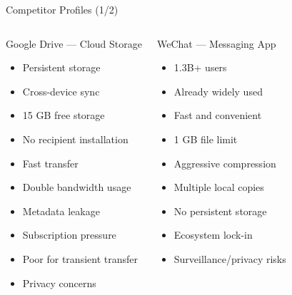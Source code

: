\documentclass[xcolor=table,dvipsnames,svgnames,aspectratio=169]{beamer}
\begin{document}
\begin{frame}{Competitor Profiles (1/2)}

\vspace{-1.2em}

\footnotesize
\setlength{\itemsep}{0em}
\linespread{0.9}\selectfont

\begin{columns}[t]


\begin{block}{Google Drive --- Cloud Storage}
\begin{itemize}
  \item[\faPlus] Persistent storage
  \item[\faPlus] Cross-device sync
  \item[\faPlus] 15 GB free storage
  \item[\faPlus] No recipient installation
  \item[\faPlus] Fast transfer
  \item[\faMinus] Double bandwidth usage
  \item[\faMinus] Metadata leakage
  \item[\faMinus] Subscription pressure
  \item[\faMinus] Poor for transient transfer
  \item[\faMinus] Privacy concerns
\end{itemize}
\end{block}


\begin{block}{WeChat --- Messaging App}
\begin{itemize}
  \item[\faPlus] 1.3B+ users
  \item[\faPlus] Already widely used
  \item[\faPlus] Fast and convenient
  \item[\faMinus] 1 GB file limit
  \item[\faMinus] Aggressive compression
  \item[\faMinus] Multiple local copies
  \item[\faMinus] No persistent storage
  \item[\faMinus] Ecosystem lock-in
  \item[\faMinus] Surveillance/privacy risks
\end{itemize}
\end{block}

\end{columns}
\end{frame}
\end{document}
